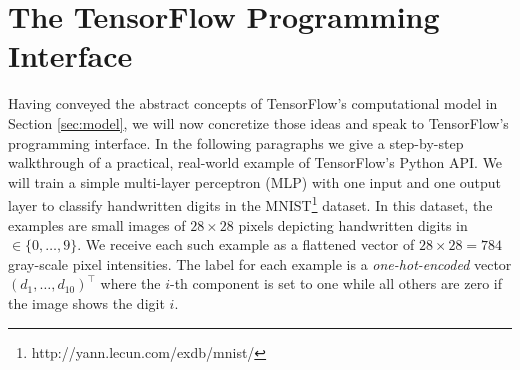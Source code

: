 \section{The TensorFlow Programming Interface}\label{sec:code}

Having conveyed the abstract concepts of TensorFlow's computational model in
Section \ref{sec:model}, we will now concretize those ideas and speak to
TensorFlow's programming interface. In the following paragraphs we give a
step-by-step walkthrough of a practical, real-world example of TensorFlow's
Python API. We will train a simple multi-layer perceptron (MLP) with one input
and one output layer to classify handwritten digits in the
MNIST\footnote{http://yann.lecun.com/exdb/mnist/} dataset. In this dataset, the
examples are small images of $28 \times 28$ pixels depicting handwritten digits
in $\in \{0, \dots, 9\}$. We receive each such example as a flattened vector of
$28 \times 28 = 784$ gray-scale pixel intensities. The label for each example is
a \emph{one-hot-encoded} vector $(d_1, \dots, d_{10})^\top$ where the $i$-th
component is set to one while all others are zero if the image shows the digit
$i$.

